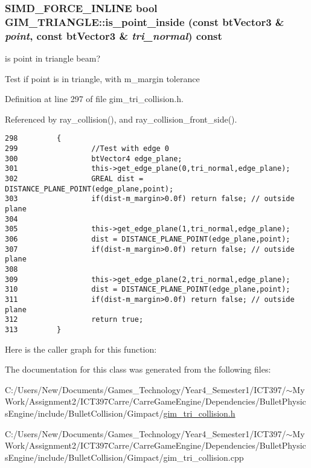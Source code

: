 \hypertarget{class_g_i_m___t_r_i_a_n_g_l_e_921acb2a97263653fce72384f177a953}{
\subsubsection[is\_\-point\_\-inside]{\setlength{\rightskip}{0pt plus 5cm}SIMD\_\-FORCE\_\-INLINE bool GIM\_\-TRIANGLE::is\_\-point\_\-inside (const btVector3 \& {\em point}, \/  const btVector3 \& {\em tri\_\-normal}) const}}
\label{class_g_i_m___t_r_i_a_n_g_l_e_921acb2a97263653fce72384f177a953}


is point in triangle beam? 

Test if point is in triangle, with m\_\-margin tolerance 

Definition at line 297 of file gim\_\-tri\_\-collision.h.

Referenced by ray\_\-collision(), and ray\_\-collision\_\-front\_\-side().

\begin{Code}\begin{verbatim}298         {
299                 //Test with edge 0
300                 btVector4 edge_plane;
301                 this->get_edge_plane(0,tri_normal,edge_plane);
302                 GREAL dist = DISTANCE_PLANE_POINT(edge_plane,point);
303                 if(dist-m_margin>0.0f) return false; // outside plane
304 
305                 this->get_edge_plane(1,tri_normal,edge_plane);
306                 dist = DISTANCE_PLANE_POINT(edge_plane,point);
307                 if(dist-m_margin>0.0f) return false; // outside plane
308 
309                 this->get_edge_plane(2,tri_normal,edge_plane);
310                 dist = DISTANCE_PLANE_POINT(edge_plane,point);
311                 if(dist-m_margin>0.0f) return false; // outside plane
312                 return true;
313         }
\end{verbatim}
\end{Code}




Here is the caller graph for this function:

The documentation for this class was generated from the following files:\begin{CompactItemize}
\item 
C:/Users/New/Documents/Games\_\-Technology/Year4\_\-Semester1/ICT397/$\sim$My Work/Assignment2/ICT397Carre/CarreGameEngine/Dependencies/BulletPhysicsEngine/include/BulletCollision/Gimpact/\hyperlink{gim__tri__collision_8h}{gim\_\-tri\_\-collision.h}\item 
C:/Users/New/Documents/Games\_\-Technology/Year4\_\-Semester1/ICT397/$\sim$My Work/Assignment2/ICT397Carre/CarreGameEngine/Dependencies/BulletPhysicsEngine/include/BulletCollision/Gimpact/gim\_\-tri\_\-collision.cpp\end{CompactItemize}
